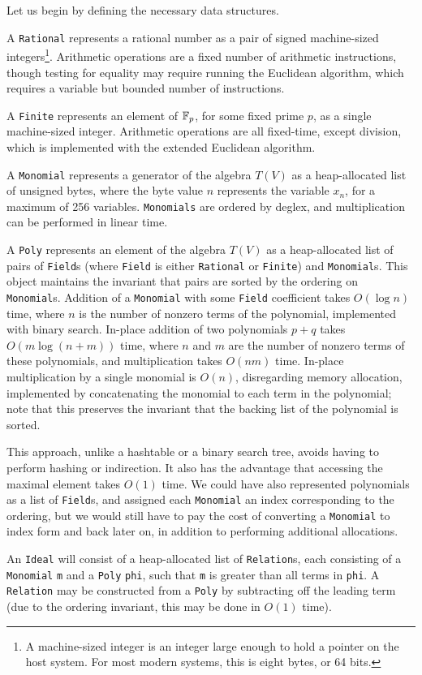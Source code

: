 Let us begin by defining the necessary data structures.

\begin{defn}
    A \verb|Rational| represents a rational number as a pair of signed machine-sized 
    integers\footnote{A machine-sized integer is an integer large enough to hold a pointer on
    the host system. For most modern systems, this is eight bytes, or 64 bits.}. Arithmetic
    operations are a fixed number of arithmetic instructions, though testing for equality
    may require running the Euclidean algorithm, which requires a variable but bounded number 
    of instructions.
    
    A \verb|Finite| represents an element of $\mathbb{F}_p$, for some fixed prime $p$, as a
    single machine-sized integer. Arithmetic operations are all fixed-time, except division,
    which is implemented with the extended Euclidean algorithm.
    
    A \verb|Monomial| represents a generator of the algebra $T(V)$ as a heap-allocated
    list of unsigned bytes, where the byte value $n$ represents the variable $x_n$,
    for a maximum of 256 variables. \verb|Monomials| are ordered by deglex,
    and multiplication can be performed in linear time.

    A \verb|Poly| represents an element of the algebra $T(V)$ as a heap-allocated
    list of pairs of \verb|Field|s (where \verb|Field| is either \verb|Rational| or
    \verb|Finite|) and \verb|Monomial|s. This object maintains the
    invariant that pairs are sorted by the ordering on \verb|Monomial|s. Addition
    of a \verb|Monomial| with some \verb|Field| coefficient takes $O(\log n)$ time,
    where $n$ is the number of nonzero terms of the polynomial, implemented with binary
    search. In-place addition of two polynomials $p + q$ takes $O(m\log (n+m))$ time, 
    where $n$ and $m$ are the number of nonzero terms of these polynomials, and
    multiplication takes $O(nm)$ time. In-place multiplication by a single monomial
    is $O(n)$, disregarding memory allocation, implemented by concatenating the monomial
    to each term in the polynomial; note that this preserves the invariant that the backing
    list of the polynomial is sorted.
    
    This approach, unlike a hashtable or a binary
    search tree, avoids having to perform hashing or indirection. It also has the
    advantage that accessing the maximal element takes $O(1)$ time. We could have
    also represented polynomials as a list of \verb|Field|s, and assigned each
    \verb|Monomial| an index corresponding to the ordering, but we would still have to pay
    the cost of converting a \verb|Monomial| to index form and back later on, in addition
    to performing additional allocations.
    
    An \verb|Ideal| will consist of a heap-allocated list of \verb|Relation|s,
    each consisting of a \verb|Monomial| \verb|m| and a \verb|Poly| \verb|phi|, 
    such that \verb|m| is greater than all terms in \verb|phi|. A \verb|Relation|
    may be constructed from a \verb|Poly| by subtracting off the leading term (due
    to the ordering invariant, this may be done in $O(1)$ time).
\end{defn}

